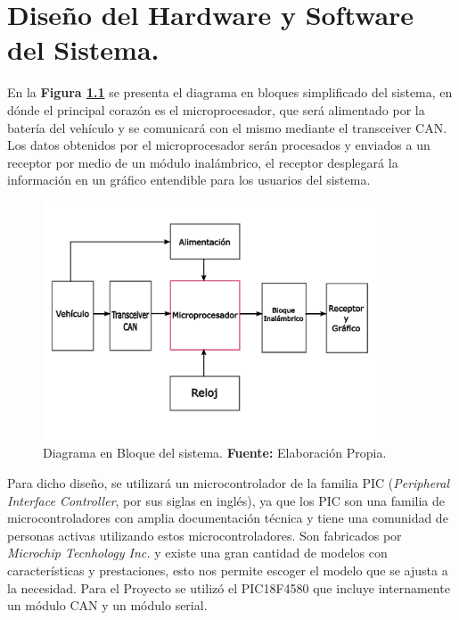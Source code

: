 \chapter[Capítulo 4. Diseño del Hardware y Software del Sistema]{Diseño del Hardware y Software del Sistema.}
En la \textbf{ Figura \ref{fig_bloque_c4}} se presenta el diagrama en bloques simplificado del sistema, en dónde el principal corazón es el microprocesador, que será alimentado por la batería del vehículo y se comunicará con el mismo mediante el transceiver CAN.  Los datos obtenidos por el microprocesador serán procesados y enviados a un receptor por medio de un módulo inalámbrico, el receptor desplegará la información en un gráfico entendible para los usuarios del sistema. 
\begin{figure}[H]
	\centering
		\includegraphics[width=0.9\textwidth]{./Cap4imagen/bloqueHardware.pdf}
	\caption[Diagrama en Bloque del sistema.]{Diagrama en Bloque del sistema.\textbf{ Fuente:}  Elaboración Propia.}
	\label{fig_bloque_c4} %
\end{figure}



Para dicho diseño, se utilizará un microcontrolador de la familia PIC (\textit{Peripheral Interface Controller}, por sus siglas en inglés), ya que los PIC son una familia de microcontroladores con amplia documentación técnica y tiene una comunidad de personas activas utilizando estos microcontroladores. Son fabricados por \textit{Microchip Tecnhology Inc.} y existe una gran cantidad de modelos con características y prestaciones, esto nos permite escoger el modelo que se ajusta a la necesidad. Para el Proyecto se utilizó el PIC18F4580 que incluye internamente un módulo CAN y un módulo serial. 

